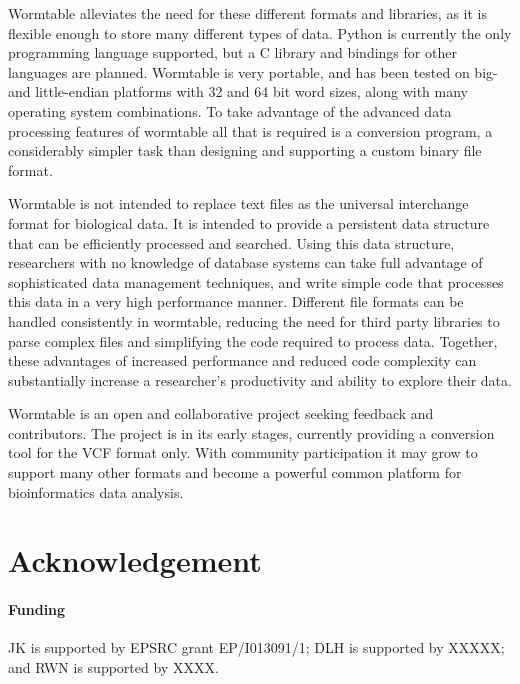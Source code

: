 \documentclass{bioinfo}
\begin{document}
Wormtable alleviates the need for these different formats and libraries,
as it is flexible enough to store many different types of data. Python 
is currently the only programming language supported, but a C library
and bindings for other languages are planned. Wormtable is very portable,
and has been tested on big- and little-endian platforms with 32 and 64
bit word sizes, along with many operating system combinations. To 
take advantage of the advanced data processing features of wormtable
all that is required is a conversion program, a considerably simpler
task than designing and supporting a custom binary file format.

Wormtable is not intended to replace text files as the universal 
interchange format for biological data. 
It is intended to provide a persistent data structure 
that can be efficiently processed 
and searched. Using this data structure, researchers with no knowledge of 
database systems can take full advantage of sophisticated 
data management techniques, and write simple code that processes this 
data in a very high performance manner. 
Different file formats can be handled consistently 
in wormtable, reducing the need for third party libraries 
to parse complex files and simplifying the code required 
to process data.
Together, these advantages of increased performance and reduced 
code complexity can substantially increase a researcher's 
productivity and ability to explore their data.

Wormtable is an open and collaborative project seeking feedback and 
contributors. The project is in its early stages, currently 
providing a conversion tool for the VCF format only. With community
participation it may grow to support many other formats and become
a powerful common platform for bioinformatics data analysis.

\section*{Acknowledgement}
\paragraph{Funding\textcolon}  
JK is supported by EPSRC grant EP/I013091/1; DLH is supported by XXXXX; 
and RWN is supported by XXXX.



\end{document}
